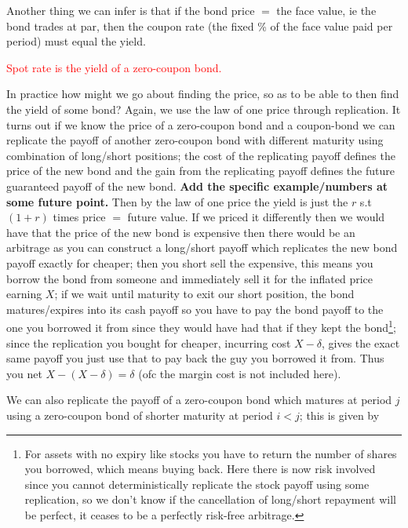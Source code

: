\documentclass[9pt]{extarticle}
\begin{document}
Another thing we can infer is that if the bond price $=$ the face value, ie the bond trades at par, 
then the coupon rate (the fixed \% of the face value paid per period) must equal the yield.

\textcolor{red}{Spot rate is the yield of a zero-coupon bond.}

In practice how might we go about finding the price, so as to be able to then find the yield of some bond? Again, we use 
the law of one price through replication. It turns out if we know the price of a zero-coupon bond and a coupon-bond we can 
replicate the payoff of another zero-coupon bond with different maturity using combination of long/short positions; the cost of the 
replicating payoff defines the price of the new bond and the gain from the replicating payoff defines the future guaranteed payoff of the new 
bond. \textbf{Add the specific example/numbers at some future point.} Then by the law of one price the yield is just the $r$ s.t $(1+r)$ times price $=$ future value. If we priced it differently then 
we would have that the price of the new bond is expensive then there would be an arbitrage 
as you can construct a long/short payoff which replicates the new bond payoff exactly for cheaper; then you short sell 
the expensive, this means you borrow the bond from someone and immediately sell it for the inflated price earning $X$; if we wait until 
maturity to exit our short position, the bond matures/expires into its cash payoff so you have to 
pay the bond payoff to the one you borrowed it from since they would have had that if 
they kept the bond\footnote{For assets with no expiry like stocks you have to return the number of shares you borrowed, which means buying back. Here there is now 
risk involved since you cannot deterministically replicate the stock payoff using some replication, so we don't know if the cancellation 
of long/short repayment will be perfect, it ceases to be a perfectly risk-free arbitrage.}; since the replication you bought for cheaper, incurring cost $X-\delta$, 
gives the exact same payoff you just use that to pay back the guy you borrowed it from. Thus you net $X-(X-\delta)=\delta$ (ofc the 
margin cost is not included here).


We can also replicate the payoff of a zero-coupon bond which matures at period $j$ 
using a zero-coupon bond of shorter maturity at period $i<j$; this is given by 
\end{document}
